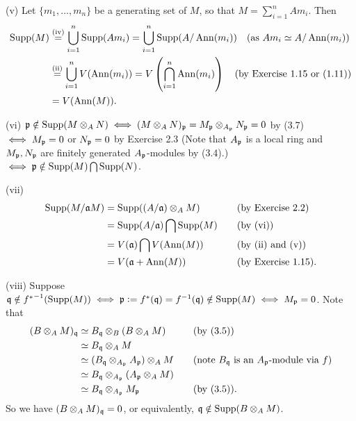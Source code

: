 \documentclass[../A&M.tex]{subfiles}
\begin{document}
(v) Let $\{m_1,\ldots,m_n\}$ be a generating set of $M$, so that $M = \sum_{i=1}^n Am_i$. Then
\begin{align*}
\operatorname{Supp}(M)
&\overset{\text{(iv)}}{=} \bigcup_{i=1}^n \operatorname{Supp}(Am_i) = \bigcup_{i=1}^n \operatorname{Supp}(A/\operatorname{Ann}(m_i))  \quad \text{(as } Am_i \simeq A/\operatorname{Ann}(m_i) \text{)} \\ 
&\overset{\text{(ii)}}{=} \bigcup_{i=1}^n V(\operatorname{Ann}(m_i)) 
=V\left(\bigcap_{i=1}^n \operatorname{Ann}(m_i) \right) \quad \text{(by Exercise 1.15 or (1.11))} \\ 
&= V(\operatorname{Ann}(M)).
\end{align*}

(vi) $\mathfrak{p} \notin \operatorname{Supp}(M\otimes_A N) \iff (M\otimes_A N)_{\mathfrak{p}} = M_{\mathfrak{p}} \otimes_{A_{\mathfrak{p}}} N_{\mathfrak{p}} = 0$ by (3.7) $\iff M_{\mathfrak{p}} = 0$ or $N_{\mathfrak{p}} = 0$ by Exercise 2.3 (Note that $A_{\mathfrak{p}}$ is a local ring and $M_{\mathfrak{p}},N_{\mathfrak{p}}$ are finitely generated $A_{\mathfrak{p}}$-modules by (3.4).) $\iff \mathfrak{p} \notin \operatorname{Supp}(M) \bigcap \operatorname{Supp}(N)$.

(vii)
\begin{alignat*}{2}
\operatorname{Supp}(M/\mathfrak{a} M)
&= \operatorname{Supp}((A/\mathfrak{a}) \otimes_A M) \quad &&\text{(by Exercise 2.2)} \\ 
&= \operatorname{Supp}(A/\mathfrak{a}) \bigcap \operatorname{Supp}(M)  \quad &&\text{(by (vi))}  \\
&= V(\mathfrak{a}) \bigcap V(\operatorname{Ann}(M))  \quad &&\text{(by (ii) and (v))} \\
&= V(\mathfrak{a} + \operatorname{Ann}(M))  \quad &&\text{(by Exercise 1.15)}.
\end{alignat*}

(viii) Suppose $\mathfrak{q} \notin {f^*}^{-1}(\operatorname{Supp}(M)) \iff \mathfrak{p}:=f^*(\mathfrak{q})=f^{-1}(\mathfrak{q}) \notin \operatorname{Supp}(M) \iff M_{\mathfrak{p}}=0$. Note that
\begin{alignat*}{2}
(B \otimes_A M)_{\mathfrak{q}}
&\simeq B_{\mathfrak{q}} \otimes_B (B \otimes_A M)    &&\quad \text{(by (3.5))}  \\
&\simeq B_{\mathfrak{q}} \otimes_A M    \\
&\simeq (B_{\mathfrak{q}} \otimes_{A_{\mathfrak{p}}} A_{\mathfrak{p}}) \otimes_A M  &&\quad \text{(note $B_{\mathfrak{q}}$ is an $A_{\mathfrak{p}}$-module via $f$)}  \\
&\simeq B_{\mathfrak{q}} \otimes_{A_{\mathfrak{p}}} (A_{\mathfrak{p}} \otimes_A M)   \\
&\simeq B_{\mathfrak{q}} \otimes_{A_{\mathfrak{p}}} M_{\mathfrak{p}}  &&\quad \text{(by (3.5))}.
\end{alignat*}
So we have $(B \otimes_A M)_{\mathfrak{q}}=0$, or equivalently, $\mathfrak{q} \notin \operatorname{Supp}(B \otimes_A M)$.
\end{document}

